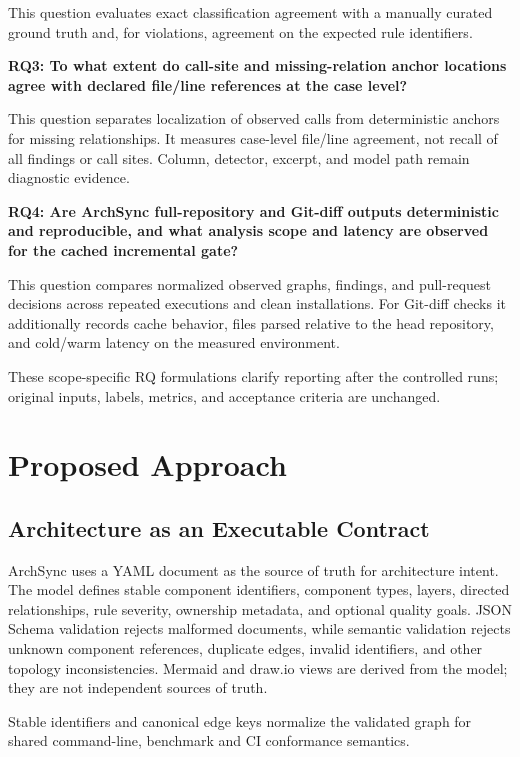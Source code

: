 This question evaluates exact classification agreement with a manually curated ground truth and, for violations, agreement on the expected rule identifiers.

\textbf{RQ3: To what extent do call-site and missing-relation anchor locations agree with declared file/line references at the case level?}

This question separates localization of observed calls from deterministic anchors for missing relationships. It measures case-level file/line agreement, not recall of all findings or call sites. Column, detector, excerpt, and model path remain diagnostic evidence.

\textbf{RQ4: Are ArchSync full-repository and Git-diff outputs deterministic and reproducible, and what analysis scope and latency are observed for the cached incremental gate?}

This question compares normalized observed graphs, findings, and pull-request decisions across repeated executions and clean installations. For Git-diff checks it additionally records cache behavior, files parsed relative to the head repository, and cold/warm latency on the measured environment.

These scope-specific RQ formulations clarify reporting after the controlled runs; original inputs, labels, metrics, and acceptance criteria are unchanged.

\section{Proposed Approach}

\subsection{Architecture as an Executable Contract}

ArchSync uses a YAML document as the source of truth for architecture intent. The model defines stable component identifiers, component types, layers, directed relationships, rule severity, ownership metadata, and optional quality goals. JSON Schema validation rejects malformed documents, while semantic validation rejects unknown component references, duplicate edges, invalid identifiers, and other topology inconsistencies. Mermaid and draw.io views are derived from the model; they are not independent sources of truth.

Stable identifiers and canonical edge keys normalize the validated graph for shared command-line, benchmark and CI conformance semantics.

